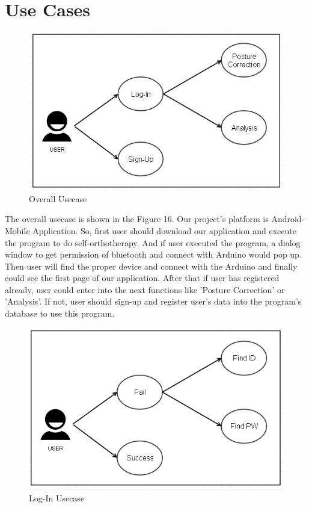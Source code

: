 \documentclass[conference]{IEEEtran}
\begin{document}
\section{Use Cases}
\begin{figure}[H]
\begin{center}
    \includegraphics[scale=0.58]{img_17.jpg}
    \caption{Overall Usecase} 
\end{center}
\end{figure}

The overall usecase is shown in the Figure 16. Our project's platform is Android-Mobile Application. So, first user should download our application and execute the program to do self-orthotherapy. And if user executed the program, a dialog window to get permission of bluetooth and connect with Arduino would pop up. Then user will find the proper device and connect with the Arduino and finally could see the first page of our application. After that if user has registered already, user could enter into the next functions like 'Posture Correction' or 'Analysis'. If not, user should sign-up and register user's data into the program's database to use this program.   

\begin{figure}[H]
\begin{center}
    \includegraphics[scale=0.5]{img_18.png}
    \caption{Log-In Usecase} 
\end{center}
\end{figure}
 		
\end{document}

